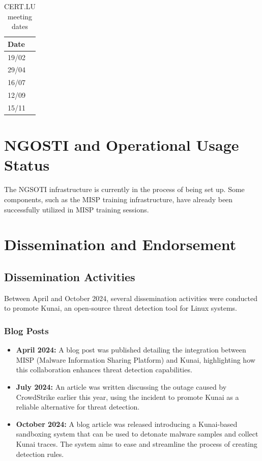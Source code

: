 \begin{table}[H]
    \centering
    \begin{tabular}{l}
    Date\\
    \hline
    19/02\\
    29/04\\
    16/07\\
    12/09\\
    15/11\\
    \end{tabular}
    \caption{CERT.LU meeting dates}
    \label{certlu}
\end{table}

\chapter{NGOSTI and Operational Usage Status}

The NGSOTI infrastructure is currently in the process of being set up. Some components, such as the MISP training infrastructure, have already been successfully utilized in MISP training sessions.

\chapter{Dissemination and Endorsement}

\section*{Dissemination Activities}

Between April and October 2024, several dissemination activities were conducted to promote Kunai, an open-source threat detection tool for Linux systems.

\subsection*{Blog Posts}
\begin{itemize}
    \item \textbf{April 2024:} A blog post was published detailing the integration between MISP (Malware Information Sharing Platform) and Kunai, highlighting how this collaboration enhances threat detection capabilities.
    \item \textbf{July 2024:} An article was written discussing the outage caused by CrowdStrike earlier this year, using the incident to promote Kunai as a reliable alternative for threat detection.
    \item \textbf{October 2024:} A blog article was released introducing a Kunai-based sandboxing system that can be used to detonate malware samples and collect Kunai traces. The system aims to ease and streamline the process of creating detection rules.
\end{itemize}


